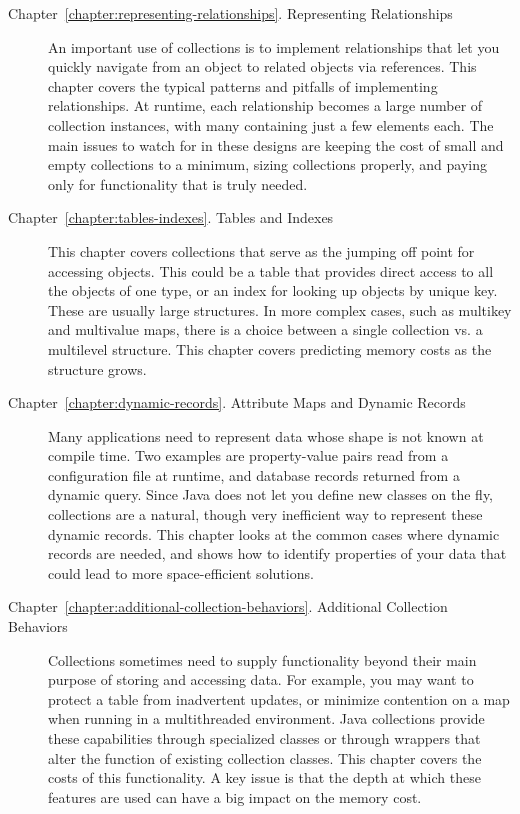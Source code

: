 \begin{description}
\item[Chapter~\ref{chapter:representing-relationships}. Representing
Relationships] An important use of collections is to implement
relationships that let you quickly navigate from an object to related objects
via references. This chapter covers the typical patterns and pitfalls of
implementing relationships. At runtime, each relationship becomes a
large number of collection instances, with many containing just a few elements
each.
The main issues to watch for in these designs
are keeping the cost of small and empty collections to a minimum, sizing
collections properly, and paying only for functionality that is truly needed.

\item[Chapter~\ref{chapter:tables-indexes}. Tables and Indexes] This
chapter covers collections that serve as the jumping off point for accessing
objects. This could be a table that provides direct access to all the
objects of one type, or an index for looking up objects by unique key. These are
usually large structures. In more complex cases, such as multikey and multivalue
maps, there is a choice between a single collection vs. a
multilevel structure. This chapter covers predicting memory costs as the structure
grows.

\item[Chapter~\ref{chapter:dynamic-records}. Attribute Maps and Dynamic
Records] Many applications need to represent data whose shape is not
known at compile time. Two examples are property-value pairs
read from a configuration file at runtime, and database records returned from
a dynamic query. Since Java does not let you define new classes on the
fly, collections are a natural, though very inefficient way to represent
these dynamic records. This chapter looks at the common cases where dynamic records
are needed, and shows how to identify properties of your data that could lead to
more space-efficient solutions.

\item[Chapter~\ref{chapter:additional-collection-behaviors}. Additional
Collection Behaviors] Collections sometimes need to supply functionality
beyond their main purpose of storing and accessing data. For example,
you may want to protect a table from inadvertent
updates, or minimize contention on a map when running in a
multithreaded environment. Java collections provide these capabilities through
specialized classes or through wrappers that alter
the function of existing collection classes. This chapter covers the costs of
this functionality. A key issue is that the depth
at which these features are used can have a big impact on the memory
cost.

\end{description}

